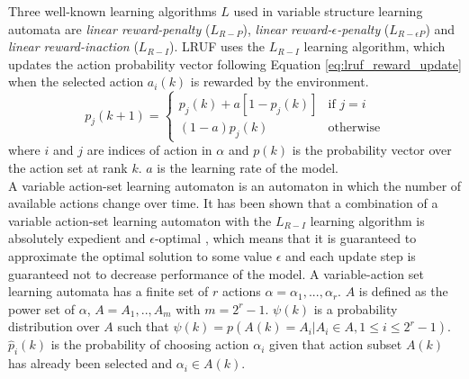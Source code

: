 Three well-known learning algorithms $L$ used in variable structure learning automata are \emph{linear reward-penalty} ($L_{R-P}$), \emph{linear reward-$\epsilon$-penalty} ($L_{R-\epsilon P}$) and \emph{linear reward-inaction} ($L_{R-I}$). LRUF uses the $L_{R-I}$ learning algorithm, which updates the action probability vector following Equation \ref{eq:lruf_reward_update} when the selected action $a_i(k)$ is rewarded by the environment.
\begin{equation}
p_j(k+1)=	\begin{cases}	p_j(k)+a[1-p_j(k)] 	&\mbox{if } j=i \\ 
							(1-a)p_j(k) 		&\mbox{otherwise} 
			\end{cases} 
\label{eq:lruf_reward_update}
\end{equation}
\noindent where $i$ and $j$ are indices of action in $\alpha$ and $p(k)$ is the probability vector over the action set at rank $k$. $a$ is the learning rate of the model.\\

A variable action-set learning automaton is an automaton in which the number of available actions change over time. It has been shown that a combination of a variable action-set learning automaton with the $L_{R-I}$ learning algorithm is absolutely expedient and $\epsilon$-optimal \cite{Thathachar1987}, which means that it is guaranteed to approximate the optimal solution to some value $\epsilon$ and each update step is guaranteed not to decrease performance of the model. A variable-action set learning automata has a finite set of $r$ actions $\alpha={\alpha_1,...,\alpha_r}$. $A$ is defined as the power set of $\alpha$, $A={A_1,..,A_m}$ with $m = 2^{r}-1$. $\psi(k)$ is a probability distribution over $A$ such that $\psi(k)=p(A(k)=A_i|A_i\in A, 1\le i \le 2^r-1)$. $\hat{p}_i(k)$ is the probability of choosing action $\alpha_i$ given that action subset $A(k)$ has already been selected and $\alpha_i \in A(k)$.\\

